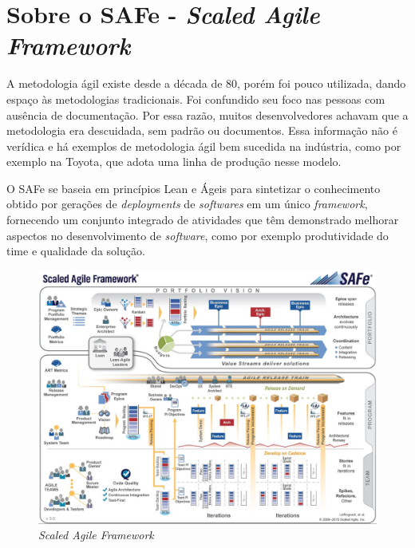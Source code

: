 \section{Sobre o SAFe - \textit{Scaled Agile Framework}}

A metodologia ágil existe desde a década de 80, porém foi pouco utilizada, dando espaço às metodologias tradicionais. Foi confundido seu foco nas pessoas com ausência de documentação. Por essa razão, muitos desenvolvedores achavam que a metodologia era descuidada, sem padrão ou documentos. Essa informação não é verídica e há exemplos de metodologia ágil bem sucedida na indústria, como por exemplo na Toyota, que adota uma linha de produção nesse modelo.~\cite{dev2}

O SAFe se baseia em princípios Lean e Ágeis para sintetizar o conhecimento obtido por gerações de \textit{deployments} de \textit{softwares} em um único \textit{framework}, fornecendo um conjunto integrado de atividades que têm demonstrado melhorar aspectos no desenvolvimento de \textit{software}, como por exemplo produtividade do time e qualidade da solução.~\cite{safe}

\begin{figure}[h]
\centering
  \includegraphics[keepaspectratio=true,scale=0.2]
  {figuras/safe.eps}
  \caption{\textit{Scaled Agile Framework}}
  \label{safe}
\end{figure}

